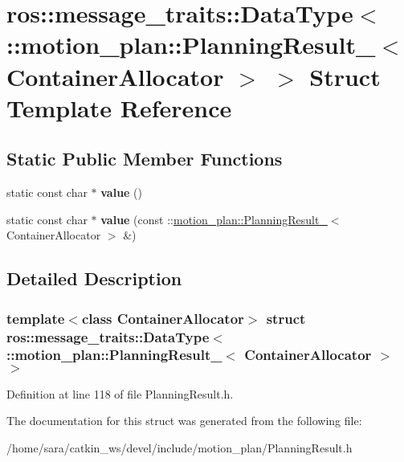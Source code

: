 \hypertarget{structros_1_1message__traits_1_1DataType_3_01_1_1motion__plan_1_1PlanningResult___3_01ContainerAllocator_01_4_01_4}{}\section{ros\+:\+:message\+\_\+traits\+:\+:Data\+Type$<$ \+:\+:motion\+\_\+plan\+:\+:Planning\+Result\+\_\+$<$ Container\+Allocator $>$ $>$ Struct Template Reference}
\label{structros_1_1message__traits_1_1DataType_3_01_1_1motion__plan_1_1PlanningResult___3_01ContainerAllocator_01_4_01_4}
\subsection*{Static Public Member Functions}
\begin{DoxyCompactItemize}
\item 
\mbox{\label{structros_1_1message__traits_1_1DataType_3_01_1_1motion__plan_1_1PlanningResult___3_01ContainerAllocator_01_4_01_4_ac4e92ee119ad7b50f2f0d1dda020fad9}} 
static const char $\ast$ {\bfseries value} ()
\item 
\mbox{\label{structros_1_1message__traits_1_1DataType_3_01_1_1motion__plan_1_1PlanningResult___3_01ContainerAllocator_01_4_01_4_afc8d375324eb368ac44764e122ec898d}} 
static const char $\ast$ {\bfseries value} (const \+::\hyperlink{structmotion__plan_1_1PlanningResult__}{motion\+\_\+plan\+::\+Planning\+Result\+\_\+}$<$ Container\+Allocator $>$ \&)
\end{DoxyCompactItemize}


\subsection{Detailed Description}
\subsubsection*{template$<$class Container\+Allocator$>$\newline
struct ros\+::message\+\_\+traits\+::\+Data\+Type$<$ \+::motion\+\_\+plan\+::\+Planning\+Result\+\_\+$<$ Container\+Allocator $>$ $>$}



Definition at line 118 of file Planning\+Result.\+h.



The documentation for this struct was generated from the following file\+:\begin{DoxyCompactItemize}
\item 
/home/sara/catkin\+\_\+ws/devel/include/motion\+\_\+plan/Planning\+Result.\+h\end{DoxyCompactItemize}
